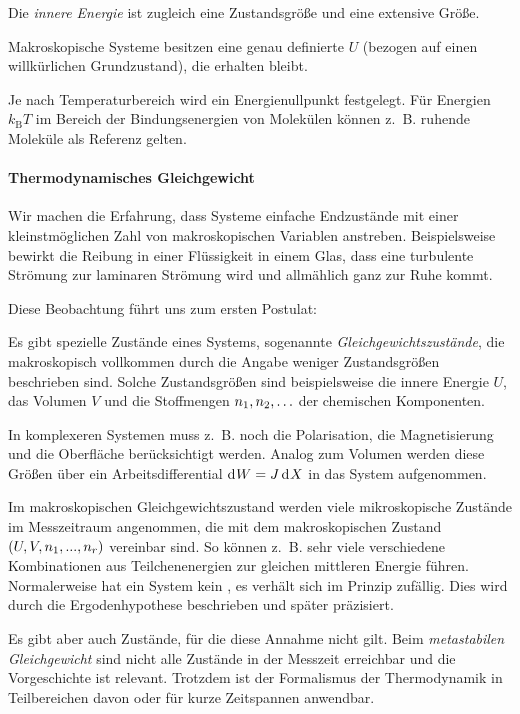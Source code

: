 Die \emph{innere Energie} ist zugleich eine Zustandsgröße und eine extensive Größe.
\begin{formal}
    Makroskopische Systeme besitzen eine genau definierte  $U$ (bezogen auf einen willkürlichen Grundzustand), die erhalten bleibt.
\end{formal}

Je nach Temperaturbereich wird ein Energienullpunkt festgelegt.
Für Energien $k_\mathrm{B}T$ im Bereich der Bindungsenergien von Molekülen können z.~B. ruhende Moleküle als Referenz gelten.


\paragraph*{Thermodynamisches Gleichgewicht}

Wir machen die Erfahrung, dass Systeme einfache Endzustände mit einer kleinstmöglichen Zahl von makroskopischen Variablen anstreben. Beispielsweise bewirkt die Reibung in einer Flüssigkeit in einem Glas, dass eine turbulente Strömung zur laminaren Strömung wird und allmählich ganz zur Ruhe kommt.

Diese Beobachtung führt uns zum ersten Postulat:
\begin{postulate}
    \label{post:gleichgewichtszustaende}
    Es gibt spezielle Zustände eines Systems, sogenannte \emph{Gleichgewichtszustände}, die makroskopisch vollkommen durch die Angabe weniger Zustandsgrößen beschrieben sind. 
    Solche Zustandsgrößen sind beispielsweise die innere Energie $U$, das Volumen $V$ und die Stoffmengen $n_1,n_2,\ldots$ der chemischen Komponenten.
\end{postulate}

In komplexeren Systemen muss z.~B. noch die Polarisation, die Magnetisierung und die Oberfläche berücksichtigt werden. Analog zum Volumen werden diese Größen über ein Arbeitsdifferential $\mathop{\mathrm{d}^{}W} = J\mathop{\mathrm{d}^{}X}$ in das System aufgenommen.

Im makroskopischen Gleichgewichtszustand werden viele mikroskopische Zustände im Messzeitraum angenommen, die mit dem makroskopischen Zustand $(U,V,n_1,...,n_r)$ vereinbar sind. So können z.~B. sehr viele verschiedene Kombinationen aus Teilchenenergien zur gleichen mittleren Energie führen. Normalerweise hat ein System kein , es verhält sich im Prinzip zufällig. Dies wird durch die Ergodenhypothese beschrieben und später präzisiert.

Es gibt aber auch Zustände, für die diese Annahme nicht gilt. Beim \emph{metastabilen Gleichgewicht} sind nicht alle Zustände in der Messzeit erreichbar und die Vorgeschichte ist relevant. Trotzdem ist der Formalismus der Thermodynamik in Teilbereichen davon oder für kurze Zeitspannen anwendbar.


